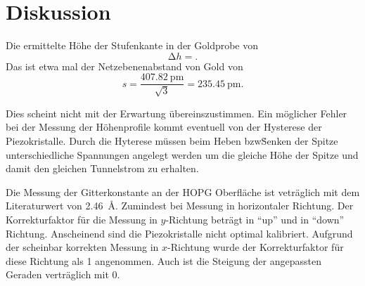 \section{Diskussion}\label{sec:Diskussion}

Die ermittelte Höhe der Stufenkante in der Goldprobe von
\begin{equation*}
  \increment h = .
\end{equation*}
 Das ist etwa  mal der Netzebenenabstand von Gold von
 \begin{equation*}
   s = \frac{\SI{407.82}{\pico\meter}}{\sqrt{3}} = \SI{235.45}{\pico\meter}.
 \end{equation*}


Dies scheint nicht mit der Erwartung übereinszustimmen. Ein möglicher Fehler bei der Messung der Höhenprofile
kommt eventuell von der Hysterese der Piezokristalle. Durch die Hyterese müssen beim Heben bzw\. Senken der Spitze unterschiedliche Spannungen angelegt werden
um die gleiche Höhe der Spitze und damit den gleichen Tunnelstrom zu erhalten.


Die Messung der Gitterkonstante an der HOPG Oberfläche ist veträglich mit dem Literaturwert von \SI{2.46}{\angstrom}. Zumindest bei Messung in horizontaler Richtung.
Der Korrekturfaktor für die Messung in $y$-Richtung beträgt  in \enquote{up} und  in
\enquote{down} Richtung. Anscheinend sind die Piezokristalle nicht optimal kalibriert.
Aufgrund der scheinbar korrekten Messung in $x$-Richtung wurde der Korrekturfaktor für diese Richtung als \num{1} angenommen.
Auch ist die Steigung der angepassten Geraden verträglich mit \num{0}.
